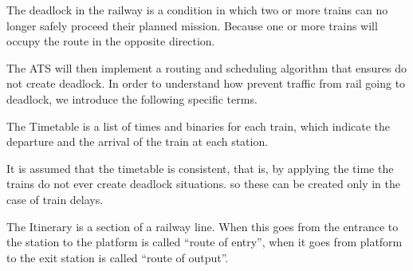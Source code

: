 \documentclass{ewic}
\begin{document}
The deadlock in the railway is a condition in which two or more trains can no longer safely proceed their planned mission. Because one or more trains will occupy the route in the opposite direction.


The ATS will then implement a routing and scheduling algorithm that ensures do not create deadlock. In order to understand how prevent traffic from rail going to deadlock, we introduce the following specific terms.


The Timetable is a list of times and binaries for each train, which indicate the departure and the arrival of the train at each station.

It is assumed that the timetable is consistent, that is, by applying the time the trains do not ever create deadlock situations. so these can be created only in the case of train delays.


The Itinerary is a section of a railway line. When this goes from the entrance to the station to the platform is called ``route of entry'', when it goes from platform to the exit station is called ``route of output''.

\end{document}
